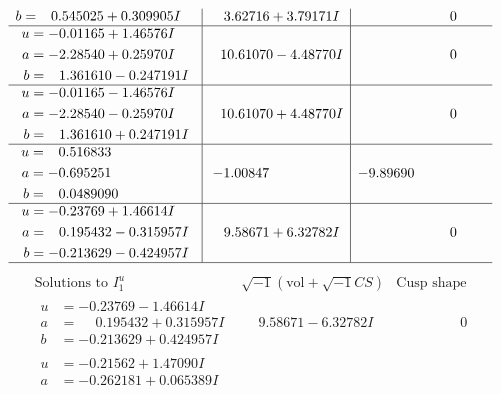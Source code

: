 \documentclass[1p]{elsarticle_modified}
\theoremstyle{definition}
\newcommand{\I}{\sqrt{-1}}
\begin{document}
$$\begin{array}{c|c|c}
\begin{aligned}
b &= \phantom{-}0.545025 + 0.309905 I\end{aligned}
 & \phantom{-}3.62716 + 3.79171 I & \phantom{-0.000000 } 0 \\ \hline\begin{aligned}
u &= -0.01165 + 1.46576 I \\
a &= -2.28540 + 0.25970 I \\
b &= \phantom{-}1.361610 - 0.247191 I\end{aligned}
 & \phantom{-}10.61070 - 4.48770 I & \phantom{-0.000000 } 0 \\ \hline\begin{aligned}
u &= -0.01165 - 1.46576 I \\
a &= -2.28540 - 0.25970 I \\
b &= \phantom{-}1.361610 + 0.247191 I\end{aligned}
 & \phantom{-}10.61070 + 4.48770 I & \phantom{-0.000000 } 0 \\ \hline\begin{aligned}
u &= \phantom{-}0.516833\phantom{ +0.000000I} \\
a &= -0.695251\phantom{ +0.000000I} \\
b &= \phantom{-}0.0489090\phantom{ +0.000000I}\end{aligned}
 & -1.00847\phantom{ +0.000000I} & -9.89690\phantom{ +0.000000I} \\ \hline\begin{aligned}
u &= -0.23769 + 1.46614 I \\
a &= \phantom{-}0.195432 - 0.315957 I \\
b &= -0.213629 - 0.424957 I\end{aligned}
 & \phantom{-}9.58671 + 6.32782 I & \phantom{-0.000000 } 0\\
 \hline 
 \end{array}$$\newpage$$\begin{array}{c|c|c}  
\text{Solutions to }I^u_{1}& \I (\text{vol} + \sqrt{-1}CS) & \text{Cusp shape}\\
 \hline 
\begin{aligned}
u &= -0.23769 - 1.46614 I \\
a &= \phantom{-}0.195432 + 0.315957 I \\
b &= -0.213629 + 0.424957 I\end{aligned}
 & \phantom{-}9.58671 - 6.32782 I & \phantom{-0.000000 } 0 \\ \hline\begin{aligned}
u &= -0.21562 + 1.47090 I \\
a &= -0.262181 + 0.065389 I \\

\end{aligned}
\end{array}$$
\end{document}
